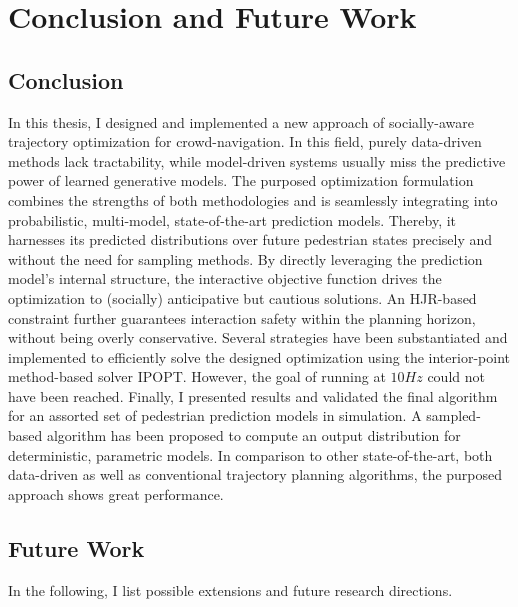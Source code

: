 \chapter{Conclusion and Future Work}
\label{text:conclusion}

\section{Conclusion}
\label{text:conclusions/conclusions}
In this thesis, I designed and implemented a new approach of socially-aware trajectory optimization for crowd-navigation. In this field, purely data-driven methods lack tractability, while model-driven systems usually miss the predictive power of learned generative models. The purposed optimization formulation combines the strengths of both methodologies and is seamlessly integrating into probabilistic, multi-model, state-of-the-art prediction models. Thereby, it harnesses its predicted distributions over future pedestrian states precisely and without the need for sampling methods.
\newline\newline
By directly leveraging the prediction model's internal structure, the interactive objective function drives the optimization to (socially) anticipative but cautious solutions. An \ac{HJR}-based constraint further guarantees interaction safety within the planning horizon, without being overly conservative.
\newline\newline
Several strategies have been substantiated and implemented to efficiently solve the designed optimization using the interior-point method-based solver \ac{IPOPT}. However, the goal of running at $10 Hz$ could not have been reached.
\newline\newline
Finally, I presented results and validated the final algorithm for an assorted set of pedestrian prediction models in simulation. A sampled-based algorithm has been proposed to compute an output distribution for deterministic, parametric models. In comparison to other state-of-the-art, both data-driven as well as conventional trajectory planning algorithms, the purposed approach shows great performance.
\newline

\section{Future Work}
\label{text:conclusions/future_work}
In the following, I list possible extensions and future research directions.

